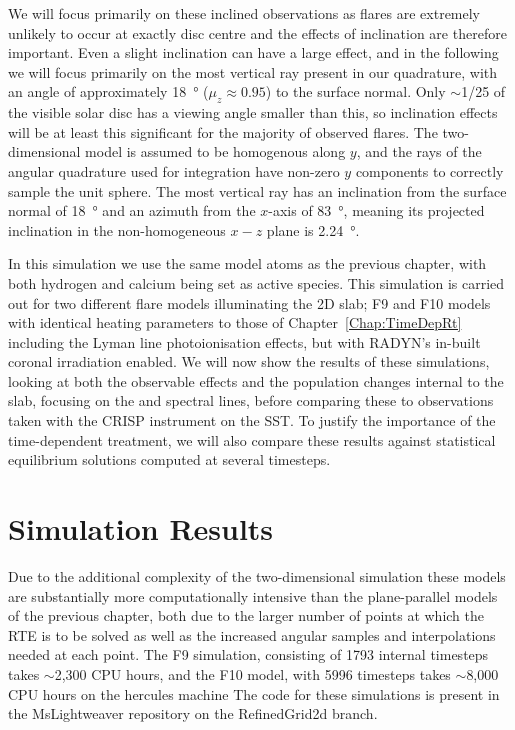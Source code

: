 We will focus primarily on these inclined observations as flares are extremely unlikely to occur at exactly disc centre and the effects of inclination are therefore important.
Even a slight inclination can have a large effect, and in the following we will focus primarily on the most vertical ray present in our quadrature, with an angle of approximately \SI{18}{\degree} ($\mu_z\approx0.95$) to the surface normal.
Only $\sim$1/25 of the visible solar disc has a viewing angle smaller than this, so inclination effects will be at least this significant for the majority of observed flares.
The two-dimensional model is assumed to be homogenous along $y$, and the rays of the angular quadrature used for integration have non-zero $y$ components to correctly sample the unit sphere.
The most vertical ray has an inclination from the surface normal of \SI{18}{\degree} and an azimuth from the $x$-axis of \SI{83}{\degree}, meaning its projected inclination in the non-homogeneous $x-z$ plane is \SI{2.24}{\degree}.

In this simulation we use the same model atoms as the previous chapter, with both hydrogen and calcium being set as active species.
This simulation is carried out for two different flare models illuminating the 2D slab; F9 and F10 models with identical heating parameters to those of Chapter~\ref{Chap:TimeDepRt} including the Lyman line photoionisation effects, but with RADYN's in-built coronal irradiation enabled.
We will now show the results of these simulations, looking at both the observable effects and the population changes internal to the slab, focusing on the \Ha{} and \CaLine{} spectral lines, before comparing these to observations taken with the CRISP instrument on the SST.
To justify the importance of the time-dependent treatment, we will also compare these results against statistical equilibrium solutions computed at several timesteps.


\section{Simulation Results}\label{Sec:2dSimResults}

Due to the additional complexity of the two-dimensional simulation these models are substantially more computationally intensive than the plane-parallel models of the previous chapter, both due to the larger number of points at which the RTE is to be solved as well as the increased angular samples and interpolations needed at each point.
The F9 simulation, consisting of 1793 internal timesteps takes $\sim$2,300 CPU hours, and the F10 model, with 5996 timesteps takes $\sim$8,000 CPU hours on the hercules machine 
{\color{Red} The code for these simulations is present in the MsLightweaver repository on the RefinedGrid2d branch.}


